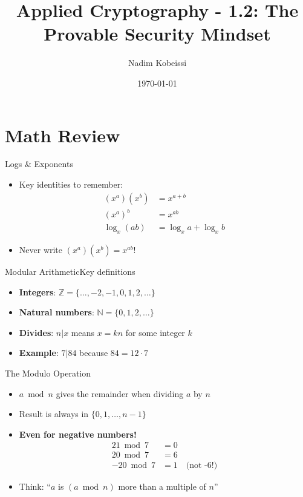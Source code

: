 \documentclass[aspectratio=169, lualatex, handout]{beamer}
\title{Applied Cryptography - 1.2: The Provable Security Mindset}
\author{Nadim Kobeissi}
\institute{American University of Beirut}
\date{\today}
\begin{document}
\begin{frame}[plain]
	\titlepage
\end{frame}

\section{Math Review}

\begin{frame}{Logs \& Exponents}
	\begin{itemize}[<+->]
		\item Key identities to remember:
		      \begin{align*}
			      (x^a)(x^b) & = x^{a+b}             \\
			      (x^a)^b    & = x^{ab}              \\
			      \log_x(ab) & = \log_x a + \log_x b
		      \end{align*}
		\item \alert{Never write $(x^a)(x^b) = x^{ab}$!}
	\end{itemize}
\end{frame}

\begin{frame}{Modular Arithmetic}{Key definitions}
	\begin{itemize}[<+->]
		\item \textbf{Integers}: $\mathbb{Z} = \{\ldots, -2, -1, 0, 1, 2, \ldots\}$
		\item \textbf{Natural numbers}: $\mathbb{N} = \{0, 1, 2, \ldots\}$
		\item \textbf{Divides}: $n | x$ means $x = kn$ for some integer $k$
		\item \textbf{Example}: $7 | 84$ because $84 = 12 \cdot 7$
	\end{itemize}
\end{frame}

\begin{frame}{The Modulo Operation}
	\begin{itemize}[<+->]
		\item $a \bmod n$ gives the remainder when dividing $a$ by $n$
		\item Result is always in $\{0, 1, \ldots, n-1\}$
		\item \textbf{Even for negative numbers!}
		      \begin{align*}
			      21 \bmod 7  & = 0                        \\
			      20 \bmod 7  & = 6                        \\
			      -20 \bmod 7 & = 1 \quad \text{(not -6!)}
		      \end{align*}
		\item Think: ``$a$ is $(a \bmod n)$ more than a multiple of $n$''
	\end{itemize}
\end{frame}
\end{document}
